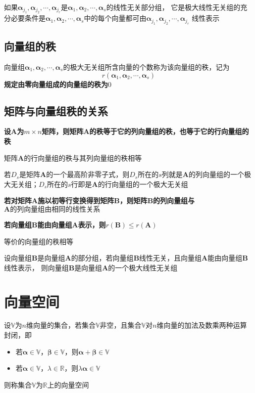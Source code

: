 \documentclass[UTF8]{ctexart}
\newcommand{\ve}[1]{{\bm{#1}}}
\newcommand{\mat}[1]{\ve{#1}}
\newcommand{\set}[1]{{\mathbb{#1}}}
\newcommand{\emplin}{\vspace{1em}}
\begin{document}
\emplin
\emplin

如果$\mat{\alpha}_{j_1},\mat{\alpha}_{j_2},\cdots,\mat{\alpha}_{j_r}$是$\mat{\alpha}_1,\mat{\alpha}_2,\cdots,\mat{\alpha}_s$的线性无关部分组，
它是极大线性无关组的充分必要条件是$\mat{\alpha}_1,\mat{\alpha}_2,\cdots,\mat{\alpha}_s$中的每个向量都可由$\mat{\alpha}_{j_1},\mat{\alpha}_{j_2},\cdots,\mat{\alpha}_{j_r}$
线性表示

\subsection*{向量组的秩}
向量组$\mat{\alpha}_1,\mat{\alpha}_2,\cdots,\mat{\alpha}_s$的极大无关组所含向量的个数称为该向量组的秩，记为
\[r(\mat{\alpha}_1,\mat{\alpha}_2,\cdots,\mat{\alpha}_s)\]
\textbf{规定由零向量组成的向量组的秩为$0$}

\subsection*{矩阵与向量组秩的关系}
\textbf{设$\mat{A}$为$m\times n$矩阵，则矩阵$\mat{A}$的秩等于它的列向量组的秩，也等于它的行向量组的秩}

矩阵$\mat{A}$的行向量组的秩与其列向量组的秩相等

若$D_s$是矩阵$\mat{A}$的一个最高阶非零子式，则$D_s$所在的$s$列就是$\mat{A}$的列向量组的一个极大无关组；$D_s$所在的$s$行即是$\mat{A}$的行向量组的一个极大无关组

\textbf{若对矩阵$\mat{A}$施以初等行变换得到矩阵$\mat{B}$，则矩阵$\mat{B}$的列向量组与$\mat{A}的列向量组由相同的线性关系$}

\emplin
\emplin

\textbf{若向量组$\mat{B}$能由向量组$\mat{A}$表示，则$r(\mat{B})\le r(\mat{A})$}

等价的向量组的秩相等

设向量组$\mat{B}$是向量组$\mat{A}$的部分组，若向量组$\mat{B}$线性无关，且向量组$\mat{A}$能由向量组$\mat{B}$线性表示，
则向量组$\mat{B}$是向量组$\mat{A}$的一个极大线性无关组

\section*{向量空间}
设$\set{V}$为$n$维向量的集合，若集合$\set{V}$非空，且集合$\set{V}$对$n$维向量的加法及数乘两种运算封闭，即
\begin{itemize}
  \item 若$\mat{\alpha}\in\set{V}$，$\mat{\beta}\in\set{V}$，则$\mat{\alpha}+\mat{\beta}\in\set{V}$
  \item 若$\mat{\alpha}\in\set{V}$，$\lambda\in\set{R}$，则$\lambda\mat{\alpha}\in\set{V}$
\end{itemize}
则称集合$\set{V}$为$\set{R}$上的向量空间
\end{document}
